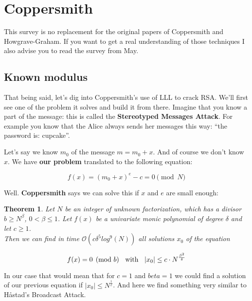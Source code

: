 \documentclass[a4paper,11pt]{article}
\newtheorem{theorem}{Theorem}
\begin{document}



\section{Coppersmith}\label{coppersmith}

This survey is no replacement for the original papers of Coppersmith\cite{coppersmith} and Howgrave-Graham\cite{howgrave-graham}. If you want to get a real understanding of those techniques I also advise you to read the survey from May\cite{may}.

\subsection{Known modulus}\label{knownmodulus}

That being said, let's dig into Coppersmith's use of LLL to crack RSA. We'll first see one of the problem it solves and build it from there. Imagine that you know a part of the message: this is called the \textbf{Stereotyped Messages Attack}. For example you know that the Alice always sends her messages this way: ``the password is: cupcake''.

Let's say we know $m_0$ of the message $m = m_0 + x$. And of course we don't know $x$. We have \textbf{our problem} translated to the following equation:

\[ f(x) = (m_0 + x)^e - c = 0 \pmod{N} \]

Well. \textbf{Coppersmith} says we can solve this if $x$ and $e$ are small enough:

\begin{theorem}
Let $N$ be an integer of unknown factorization, which has a divisor $b \geq N^{\beta}$, $0 < \beta \leq 1$. Let $f(x)$ be a univariate monic polynomial of degree $\delta$ and let $c \geq 1$.\\
Then we can find in time $\mathcal{O}(c\delta^5log^9(N))$ all solutions $x_0$ of the equation

\[ f(x) = 0 \pmod{b} \hspace{2mm} \text{ with } \hspace{2mm} |x_0| \leq c \cdot N^{\frac{\beta^2}{\delta}} \]
\end{theorem}

In our case that would mean that for $c=1$ and $beta=1$ we could find a solution of our previous equation if $|x_0| \leq N^{\frac{1}{e}}$. And here we find something very similar to Håstad's Broadcast Attack.
\end{document}
